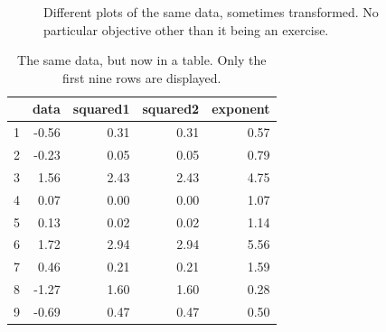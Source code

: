 \documentclass[a4paper,12pt]{article}
\begin{document}
\begin{figure}[htbp]
    \caption{Different plots of the same data, sometimes transformed. No particular objective other than it being an exercise.}
    \label{fig:grid}
\end{figure}


\begin{table}[ht]
\centering
\caption{The same data, but now in a table. Only the first nine rows are displayed.}
\label{tab:data}
\begin{tabular}{rrrrr}
  \hline
  & data & squared1 & squared2 & exponent \\ 
  \hline
  1 & -0.56 & 0.31 & 0.31 & 0.57 \\ 
  2 & -0.23 & 0.05 & 0.05 & 0.79 \\ 
  3 & 1.56 & 2.43 & 2.43 & 4.75 \\ 
  4 & 0.07 & 0.00 & 0.00 & 1.07 \\ 
  5 & 0.13 & 0.02 & 0.02 & 1.14 \\ 
  6 & 1.72 & 2.94 & 2.94 & 5.56 \\ 
  7 & 0.46 & 0.21 & 0.21 & 1.59 \\ 
  8 & -1.27 & 1.60 & 1.60 & 0.28 \\ 
  9 & -0.69 & 0.47 & 0.47 & 0.50 \\ 
  \hline
\end{tabular}
\end{table}


\newpage
\end{document}
